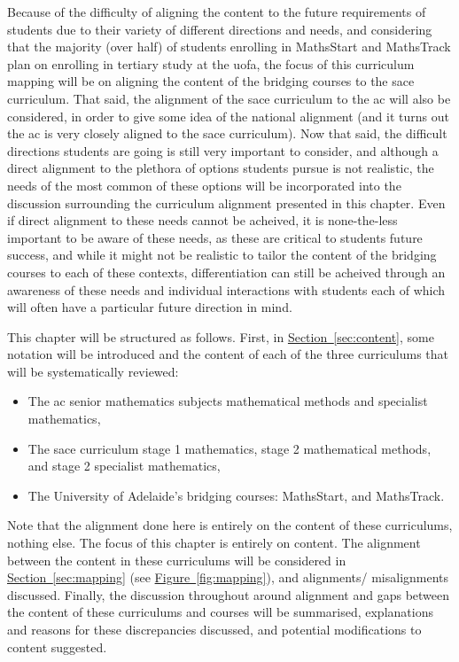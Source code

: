 \documentclass[twoside,12pt,a4paper]{report}
\newcommand{\refsec}[1]{\hyperref[sec:#1]{Section~\ref{sec:#1}}}
\newcommand{\reffig}[1]{\hyperref[fig:#1]{Figure~\ref{fig:#1}}}
\begin{document}
Because of the difficulty of aligning the content to the future requirements of students due to their variety of different directions and needs, and considering that the majority (over half) of students enrolling in MathsStart and MathsTrack plan on enrolling in tertiary study at the \gls{uofa}, the focus of this curriculum mapping will be on aligning the content of the bridging courses to the \gls{sace} curriculum. That said, the alignment of the \gls{sace} curriculum to the \gls{ac} will also be considered, in order to give some idea of the national alignment (and it turns out the \gls{ac} is very closely aligned to the \gls{sace} curriculum). Now that said, the difficult directions students are going is still very important to consider, and although a direct alignment to the plethora of options students pursue is not realistic, the needs of the most common of these options will be incorporated into the discussion surrounding the curriculum alignment presented in this chapter. Even if direct alignment to these needs cannot be acheived, it is none-the-less important to be aware of these needs, as these are critical to students future success, and while it might not be realistic to tailor the content of the bridging courses to each of these contexts, differentiation can still be acheived through an awareness of these needs and individual interactions with students each of which will often have a particular future direction in mind.

This chapter will be structured as follows. First, in \refsec{content}, some notation will be introduced and the content of each of the three curriculums that will be systematically reviewed:
\begin{itemize}
	\item The \gls{ac} senior mathematics subjects mathematical methods and specialist mathematics,
	\item The \gls{sace} curriculum stage 1 mathematics, stage 2 mathematical methods, and stage 2 specialist mathematics,
	\item The University of Adelaide's bridging courses: MathsStart, and MathsTrack.
\end{itemize}
Note that the alignment done here is entirely on the content of these curriculums, nothing else. The focus of this chapter is entirely on content. The alignment between the content in these curriculums will be considered in \refsec{mapping} (see \reffig{mapping}), and alignments/ misalignments discussed. Finally, the discussion throughout around alignment and gaps between the content of these curriculums and courses will be summarised, explanations and reasons for these discrepancies discussed, and potential modifications to content suggested. 
\end{document}
